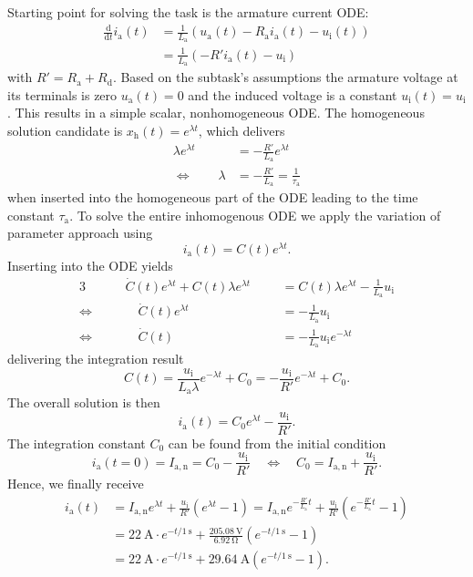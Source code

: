 \begin{solutionblock}
    Starting point for solving the task is the armature current ODE:
    \begin{align*}
    \frac{\mathrm{d}}{\mathrm{d} t} i_\mathrm{a}(t) &= \frac{1}{L_\mathrm{a}}\left(u_\mathrm{a}(t) - R_\mathrm{a} i_\mathrm{a}(t) - u_\mathrm{i}(t)  \right)\\ & = \frac{1}{L_\mathrm{a}}\left(- R' i_\mathrm{a}(t) - u_\mathrm{i}  \right)
    \end{align*}
    with $R' = R_\mathrm{a} + R_\mathrm{d}$.  Based on the subtask's assumptions the armature voltage at its terminals is zero $u_\mathrm{a}(t)=0$ and the induced voltage is a constant $u_\mathrm{i}(t) = u_\mathrm{i}$.  This results in a simple scalar, nonhomogeneous ODE. The homogeneous solution candidate is $x_\mathrm{h}(t) = e^{\lambda t}$, which delivers
    \begin{align*}
    \lambda e^{\lambda t} &= - \frac{R'}{L_\mathrm{a}} e^{\lambda t}
    \\
    \Leftrightarrow \qquad \lambda &=- \frac{R'}{L_\mathrm{a}} = \frac{1}{\tau_\mathrm{a}}
    \end{align*}
    when inserted into the homogeneous part of the ODE leading to the time constant $\tau_\mathrm{a}$. To solve the entire inhomogenous ODE we apply the variation of parameter approach using
    $$
    i_\mathrm{a}(t) = C(t)e^{\lambda t}.
    $$
    Inserting into the ODE yields
    \begin{alignat*}{3}
   &&\quad \dot{C}(t) e^{\lambda t} +  C(t) \lambda e^{\lambda t} &&&=  C(t) \lambda e^{\lambda t} - \frac{1}{L_\mathrm{a}} u_\mathrm{i} \\
    \Leftrightarrow&& \qquad \dot{C}(t) e^{\lambda t} &&&= - \frac{1}{L_\mathrm{a}} u_\mathrm{i}\\
    \Leftrightarrow&& \qquad \dot{C}(t) &&&= -\frac{1}{L_\mathrm{a}} u_\mathrm{i} e^{-\lambda t}
    \end{alignat*}
    delivering the integration result
    $$
    C(t) = \frac{u_\mathrm{i}}{L_\mathrm{a} \lambda} e^{-\lambda t} + C_0 =  -\frac{u_\mathrm{i}}{R'} e^{-\lambda t} + C_0.
    $$
    The overall solution is then
    $$
    i_\mathrm{a}(t) = C_0 e^{\lambda t} - \frac{u_\mathrm{i}}{R'} .
    $$
    The integration constant $C_0$ can be found from the initial condition
    $$
    i_\mathrm{a}(t=0) = I_\mathrm{a,n} = C_0 - \frac{u_\mathrm{i}}{R'} \quad \Leftrightarrow \quad C_0 = I_\mathrm{a,n} + \frac{u_\mathrm{i}}{R'} .
    $$
    Hence, we finally receive
    \begin{align*}
        i_\mathrm{a}(t) &= I_\mathrm{a,n} e^{\lambda t} + \frac{u_\mathrm{i}}{R'}(e^{\lambda t}-1) = I_\mathrm{a,n} e^{-\frac{R'}{L_\mathrm{a}} t} + \frac{u_\mathrm{i}}{R'}(e^{-\frac{R'}{L_\mathrm{a}} t}-1)\\
        &= \SI{22}{\ampere} \cdot e^{-t / \SI{1}{\second}} + \frac{\SI{205.08}{\volt}}{\SI{6.92}{\ohm}}(e^{-t / \SI{1}{\second}}-1)\\
        &= \SI{22}{\ampere} \cdot e^{-t / \SI{1}{\second}} + \SI{29.64}{\ampere} (e^{-t / \SI{1}{\second}}-1).
    \end{align*}
\end{solutionblock}


